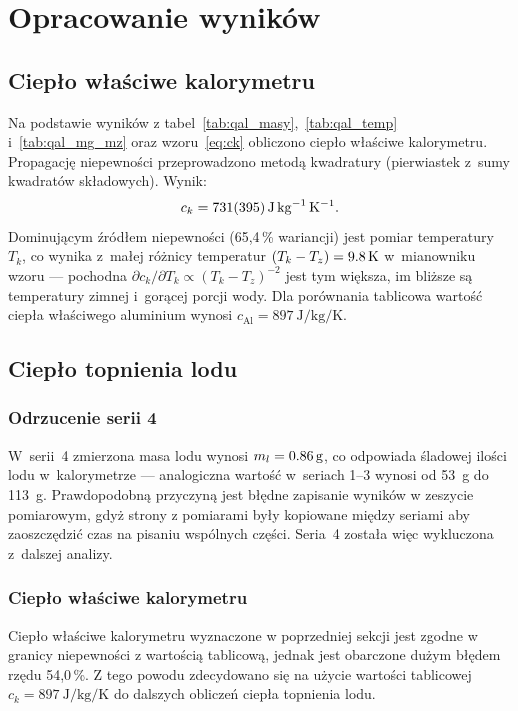 \documentclass[12pt, a4paper]{article}
\begin{document}
\section{Opracowanie wyników}

\subsection{Ciepło właściwe kalorymetru}

Na podstawie wyników z tabel~\ref{tab:qal_masy},~\ref{tab:qal_temp} i~\ref{tab:qal_mg_mz}
oraz wzoru~\eqref{eq:ck} obliczono ciepło
właściwe kalorymetru. Propagację niepewności przeprowadzono metodą kwadratury
(pierwiastek z~sumy kwadratów składowych). Wynik:
\begin{equation}
    c_k = \qty{731 \pm 395}{\joule\per\kilogram\per\kelvin}.
\end{equation}
Dominującym źródłem niepewności (65{,}4\,\% wariancji) jest pomiar temperatury~$T_k$,
co wynika z~małej różnicy temperatur $(T_k - T_z) = \qty{9{,}8}{\kelvin}$ w~mianowniku
wzoru --- pochodna $\partial c_k/\partial T_k \propto {(T_k-T_z)}^{-2}$ jest tym większa,
im bliższe są temperatury zimnej i~gorącej porcji wody.
Dla porównania tablicowa wartość ciepła właściwego aluminium wynosi
$c_{\mathrm{Al}} = \qty{897}{\joule\per\kilogram\per\kelvin}$.

\subsection{Ciepło topnienia lodu}

\subsubsection{Odrzucenie serii 4}

W~serii~4 zmierzona masa lodu wynosi $m_l = \qty{0{,}86}{\gram}$, co odpowiada
śladowej ilości lodu w~kalorymetrze --- analogiczna wartość w~seriach 1--3 wynosi
od \qty{53}{\gram} do \qty{113}{\gram}. Prawdopodobną przyczyną jest błędne zapisanie wyników w zeszycie pomiarowym, gdyż strony z pomiarami były kopiowane między seriami aby zaoszczędzić czas na pisaniu wspólnych części. Seria~4 została więc wykluczona z~dalszej analizy.

\subsubsection{Ciepło właściwe kalorymetru}
Ciepło właściwe kalorymetru wyznaczone w poprzedniej sekcji jest zgodne w granicy niepewności z wartością tablicową, jednak jest obarczone dużym błędem rzędu 54{,}0\,\%. Z tego powodu zdecydowano się na użycie wartości tablicowej $c_k = \qty{897}{\joule\per\kilogram\per\kelvin}$ do dalszych obliczeń ciepła topnienia lodu.
\end{document}
